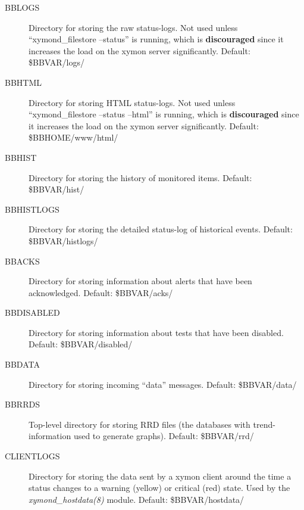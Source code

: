 \begin{description}
 

\item[BBLOGS] Directory for storing the raw status-logs. Not used unless ``xymond\_filestore --status'' is running, which is \textbf{discouraged}
 since it increases the load on the xymon server significantly. Default: \$BBVAR/logs/ 

 

\item[BBHTML] Directory for storing HTML status-logs. Not used unless ``xymond\_filestore --status --html'' is running, which is \textbf{discouraged}
 since it increases the load on the xymon server significantly. Default: \$BBHOME/www/html/ 

 

\item[BBHIST] Directory for storing the history of monitored items. Default: \$BBVAR/hist/ 

 

\item[BBHISTLOGS] Directory for storing the detailed status-log of historical events. Default: \$BBVAR/histlogs/ 

 

\item[BBACKS] Directory for storing information about alerts that have been acknowledged. Default: \$BBVAR/acks/ 

 

\item[BBDISABLED] Directory for storing information about tests that have been disabled. Default: \$BBVAR/disabled/ 

 

\item[BBDATA] Directory for storing incoming ``data'' messages. Default: \$BBVAR/data/ 

 

\item[BBRRDS] Top-level directory for storing RRD files (the databases with trend-information used to generate graphs). Default: \$BBVAR/rrd/ 

 

\item[CLIENTLOGS] Directory for storing the data sent by a xymon client around the time a status changes to a warning (yellow) or critical (red) state. Used by the \emph{xymond\_hostdata(8)}
 module. Default: \$BBVAR/hostdata/ 

 


 


\end{description}

